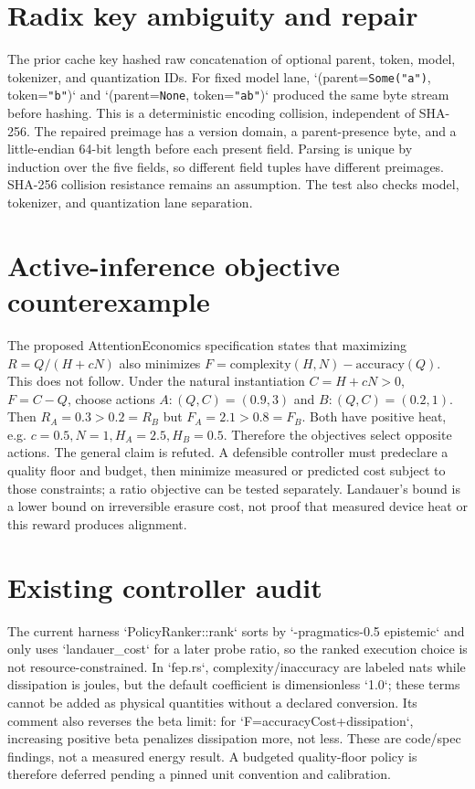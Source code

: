 \documentclass{article}
\begin{document}
\section*{Radix key ambiguity and repair}
The prior cache key hashed raw concatenation of optional parent, token, model, tokenizer, and quantization IDs. For fixed model lane, `(parent=\texttt{Some("a")}, token=\texttt{"b"})` and `(parent=\texttt{None}, token=\texttt{"ab"})` produced the same byte stream before hashing. This is a deterministic encoding collision, independent of SHA-256. The repaired preimage has a version domain, a parent-presence byte, and a little-endian 64-bit length before each present field. Parsing is unique by induction over the five fields, so different field tuples have different preimages. SHA-256 collision resistance remains an assumption. The test also checks model, tokenizer, and quantization lane separation.
\section*{Active-inference objective counterexample}
The proposed AttentionEconomics specification states that maximizing $R=Q/(H+cN)$ also minimizes $F=\mathrm{complexity}(H,N)-\mathrm{accuracy}(Q)$. This does not follow. Under the natural instantiation $C=H+cN>0$, $F=C-Q$, choose actions $A:(Q,C)=(0.9,3)$ and $B:(Q,C)=(0.2,1)$. Then $R_A=0.3>0.2=R_B$ but $F_A=2.1>0.8=F_B$. Both have positive heat, e.g. $c=0.5,N=1,H_A=2.5,H_B=0.5$. Therefore the objectives select opposite actions. The general claim is refuted. A defensible controller must predeclare a quality floor and budget, then minimize measured or predicted cost subject to those constraints; a ratio objective can be tested separately. Landauer's bound is a lower bound on irreversible erasure cost, not proof that measured device heat or this reward produces alignment.
\section*{Existing controller audit}
The current harness `PolicyRanker::rank` sorts by `-pragmatics-0.5 epistemic` and only uses `landauer_cost` for a later probe ratio, so the ranked execution choice is not resource-constrained. In `fep.rs`, complexity/inaccuracy are labeled nats while dissipation is joules, but the default coefficient is dimensionless `1.0`; these terms cannot be added as physical quantities without a declared conversion. Its comment also reverses the beta limit: for `F=accuracyCost+\beta\cdot dissipation`, increasing positive beta penalizes dissipation more, not less. These are code/spec findings, not a measured energy result. A budgeted quality-floor policy is therefore deferred pending a pinned unit convention and calibration.
\end{document}
